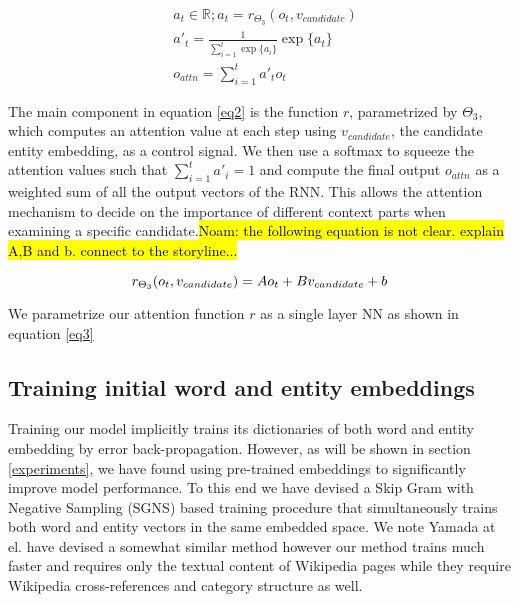 \documentclass[11pt]{article}
\begin{document}
	\begin{equation}
	\label{eq2}
	\begin{aligned}
	& a_t \in \mathbb{R}; a_t=r_{\Theta_3}(o_t, v_{candidate}) \\
	& a'_t  = \frac{1}{\sum_{i=1}^{t} \exp\{a_i\}} \exp \{a_t\} \\
	& o_{attn}=\sum_{i=1}^{t} a'_t o_t
	\end{aligned}
	\end{equation}
	
	The main component in equation \ref{eq2} is the function $r$, parametrized by $\Theta_3$, which computes an attention value at each step using $v_{candidate}$, the candidate entity embedding, as a control signal. We then use a softmax to squeeze the attention values such that $\sum_{i=1}^{t} a'_i = 1$ and compute the final output $o_{attn}$ as a weighted sum of all the output vectors of the RNN. This allows the attention mechanism to decide on the importance of different context parts when examining a specific candidate.\hl{Noam: the following equation is not clear. explain A,B and b. connect to the storyline...}
	
	\begin{equation}
	\label{eq3}
	r_{\Theta_3}(o_t, v_{candidate}) = Ao_t + Bv_{candidate} + b \\
	\end{equation}
	
	We parametrize our attention function $r$ as a single layer NN as shown in equation \ref{eq3}
	
	\subsection{Training initial word and entity embeddings}
	
	Training our model implicitly trains its dictionaries of both word and entity embedding by error back-propagation. However, as will be shown in section \ref{experiments}, we have found using pre-trained embeddings to significantly improve model performance. To this end we have devised a Skip Gram with Negative Sampling (SGNS) \cite{mikolov2013distributed} based training procedure that simultaneously trains both word and entity vectors in the same embedded space. We note Yamada at el. \cite{yamada2016joint} have devised a somewhat similar method however our method trains much faster and requires only the textual content of Wikipedia pages while they require Wikipedia cross-references and category structure as well.
	
\end{document}
